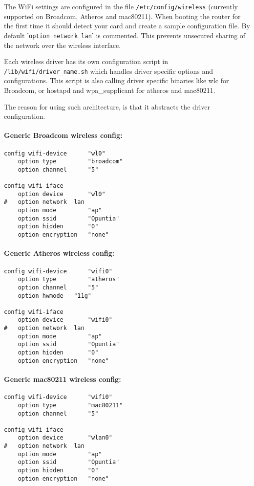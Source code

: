 The WiFi settings are configured in the file \texttt{/etc/config/wireless}
(currently supported on Broadcom, Atheros and mac80211). When booting the router for the first time
it should detect your card and create a sample configuration file. By default '\texttt{option network  lan}' is
commented. This prevents unsecured sharing of the network over the wireless interface.

Each wireless driver has its own configuration script in \texttt{/lib/wifi/driver\_name.sh} which handles
driver specific options and configurations. This script is also calling driver specific binaries like wlc for
Broadcom, or hostapd and wpa\_supplicant for atheros and mac80211.

The reason for using such architecture, is that it abstracts the driver configuration. 

\paragraph{Generic Broadcom wireless config:}

\begin{Verbatim}
config wifi-device      "wl0"
    option type         "broadcom"
    option channel      "5"

config wifi-iface
    option device       "wl0"
#   option network  lan
    option mode         "ap"
    option ssid         "Opuntia"
    option hidden       "0"
    option encryption   "none"
\end{Verbatim}

\paragraph{Generic Atheros wireless config:}

\begin{Verbatim}
config wifi-device      "wifi0"
    option type         "atheros"
    option channel      "5"
    option hwmode	"11g"

config wifi-iface
    option device       "wifi0"
#   option network  lan
    option mode         "ap"
    option ssid         "Opuntia"
    option hidden       "0"
    option encryption   "none"
\end{Verbatim}

\paragraph{Generic mac80211 wireless config:}

\begin{Verbatim}
config wifi-device      "wifi0"
    option type         "mac80211"
    option channel      "5"

config wifi-iface
    option device       "wlan0"
#   option network  lan
    option mode         "ap"
    option ssid         "Opuntia"
    option hidden       "0"
    option encryption   "none"
\end{Verbatim}

